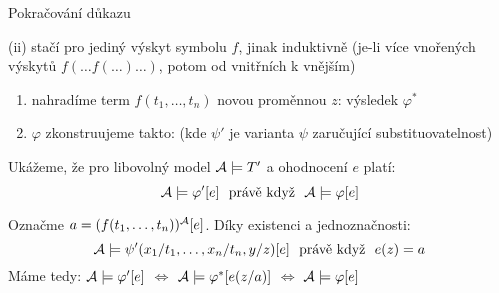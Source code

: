 \documentclass{beamer}
\begin{document}
\begin{frame}{Pokračování důkazu}

    \alert{(ii)} stačí pro jediný výskyt symbolu $f$, jinak induktivně (je-li více vnořených výskytů $f(\dots f(\dots)\dots)$, potom od vnitřních k vnějším)

    \begin{enumerate}
    \item  nahradíme term $f(t_1,\dots,t_n)$ \alert{novou} proměnnou $z$: \alert{výsledek $\varphi^*$}     
    \item $\varphi$ zkonstruujeme takto: 
     (kde $\psi'$ je varianta $\psi$ zaručující substituovatelnost)
    \end{enumerate}

    Ukážeme, že pro libovolný model $\mathcal{A}\models T'$ a ohodnocení $e$ platí:
    $$
    \mathcal{A}\models\varphi'[e]\ \text{ právě když }\ \mathcal{A}\models\varphi[e]
    $$
      
    Označme \alert{$a=(f(t_1,\dots,t_n))^{\mathcal{A}}[e]$}. Díky existenci a jednoznačnosti:
    $$
    \A\models\psi'(x_1/t_1,\dots,x_n/t_n,y/z)[e]\ \text{ právě když }\ e(z)=a 
    $$
    Máme tedy: $\mathcal{A}\models\varphi'[e]$ $\Leftrightarrow$ $\mathcal{A}\models\varphi^*[e(z/a)]$ $\Leftrightarrow$ $\mathcal{A}\models\varphi[e]$ \hfill\qedsymbol    

\end{frame}
\end{document}
